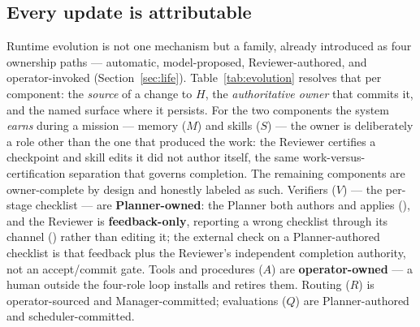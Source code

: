 \subsection{Every update is attributable}

Runtime evolution is not one mechanism but a family, already introduced as four
ownership paths --- automatic, model-proposed, Reviewer-authored, and
operator-invoked (Section~\ref{sec:life}). Table~\ref{tab:evolution} resolves that
per component: the \emph{source} of a change to $H$, the \emph{authoritative owner}
that commits it, and the named surface where it persists. For the two components the
system \emph{earns} during a mission --- memory ($M$) and skills ($S$) --- the owner
is deliberately a role other than the one that produced the work: the Reviewer
certifies a checkpoint and skill edits it did not author itself, the same
work-versus-certification separation that governs completion. The remaining
components are owner-complete by design and honestly labeled as such. Verifiers
($V$) --- the per-stage checklist --- are \textbf{Planner-owned}: the Planner both
authors and applies  (), and the
Reviewer is \textbf{feedback-only}, reporting a wrong checklist through its
 channel () rather than editing
it; the external check on a Planner-authored checklist is that feedback plus the
Reviewer's independent completion authority, not an accept/commit gate. Tools and
procedures ($A$) are \textbf{operator-owned} --- a human outside the four-role loop
installs and retires them. Routing ($R$) is operator-sourced and Manager-committed;
evaluations ($Q$) are Planner-authored and scheduler-committed.


